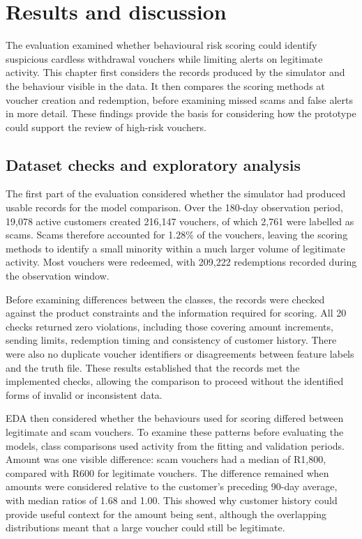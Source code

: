 \documentclass[a4paper,12pt]{article}
\begin{document}
\setcounter{section}{5}

\section{Results and discussion}

The evaluation examined whether behavioural risk scoring could identify suspicious cardless withdrawal vouchers while limiting alerts on legitimate activity. This chapter first considers the records produced by the simulator and the behaviour visible in the data. It then compares the scoring methods at voucher creation and redemption, before examining missed scams and false alerts in more detail. These findings provide the basis for considering how the prototype could support the review of high-risk vouchers.

\FloatBarrier\subsection{Dataset checks and exploratory analysis}

The first part of the evaluation considered whether the simulator had produced usable records for the model comparison. Over the 180-day observation period, 19,078 active customers created 216,147 vouchers, of which 2,761 were labelled as scams. Scams therefore accounted for 1.28\% of the vouchers, leaving the scoring methods to identify a small minority within a much larger volume of legitimate activity. Most vouchers were redeemed, with 209,222 redemptions recorded during the observation window.

Before examining differences between the classes, the records were checked against the product constraints and the information required for scoring. All 20 checks returned zero violations, including those covering amount increments, sending limits, redemption timing and consistency of customer history. There were also no duplicate voucher identifiers or disagreements between feature labels and the truth file. These results established that the records met the implemented checks, allowing the comparison to proceed without the identified forms of invalid or inconsistent data.

EDA then considered whether the behaviours used for scoring differed between legitimate and scam vouchers. To examine these patterns before evaluating the models, class comparisons used activity from the fitting and validation periods. Amount was one visible difference: scam vouchers had a median of R1,800, compared with R600 for legitimate vouchers. The difference remained when amounts were considered relative to the customer's preceding 90-day average, with median ratios of 1.68 and 1.00. This showed why customer history could provide useful context for the amount being sent, although the overlapping distributions meant that a large voucher could still be legitimate.
\end{document}
